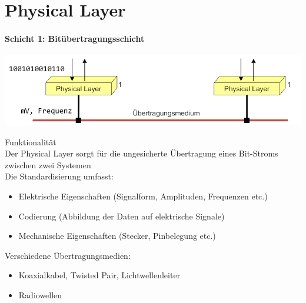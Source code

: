 \section{Physical Layer}
\paragraph{Schicht 1: Bitübertragungsschicht}
\includegraphics[width=0.75\linewidth]{images/Physical_Layer.png}
\begin{definition}{Funktionalität}\\
    Der Physical Layer sorgt für die ungesicherte Übertragung eines Bit-Stroms zwischen zwei Systemen\\
    Die Standardisierung umfasst:
\begin{itemize}
    \item Elektrische Eigenschaften (Signalform, Amplituden, Frequenzen etc.)
    \item Codierung (Abbildung der Daten auf elektrische Signale)
    \item Mechanische Eigenschaften (Stecker, Pinbelegung etc.)
\end{itemize}
\end{definition}

\begin{remark}
    Verschiedene Übertragungsmedien:
    \begin{itemize}
        \item Koaxialkabel, Twisted Pair, Lichtwellenleiter
        \item Radiowellen
    \end{itemize}
\end{remark}

